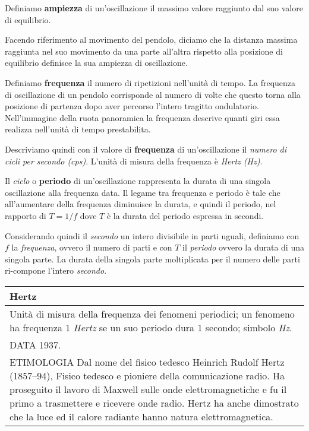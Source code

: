 Definiamo \textbf{ampiezza} di un'oscillazione il massimo valore raggiunto
dal suo valore di equilibrio.

Facendo riferimento al movimento del pendolo, diciamo che la distanza massima
raggiunta nel suo movimento da una parte all'altra rispetto alla posizione di
equilibrio definisce la sua ampiezza di oscillazione.



Definiamo \textbf{frequenza} il numero di ripetizioni nell'unità di tempo. La
frequenza di oscillazione di un pendolo corrisponde al numero di volte che questo
torna alla posizione di partenza dopo aver percorso l'intero tragitto ondulatorio.
Nell'immagine della ruota panoramica la frequenza descrive quanti giri essa realizza
nell'unità di tempo prestabilita.

Descriviamo quindi con il valore di \textbf{frequenza} di un'oscillazione il
\emph{numero di cicli per secondo (cps)}. L'unità di misura della frequenza è
\emph{Hertz (Hz)}.



Il \emph{ciclo} o \textbf{periodo} di un'oscillazione rappresenta la durata di
una singola oscillazione alla frequenza data.
Il legame tra frequenza e periodo è tale che all'aumentare della frequenza
diminuisce la durata, e quindi il periodo, nel rapporto di $T = 1/f$ dove
$T$ è la durata del periodo espressa in secondi.

Considerando quindi il \emph{secondo} un intero divisibile in parti uguali,
definiamo con $f$ la \emph{frequenza}, ovvero il numero di parti e con $T$
il \emph{periodo} ovvero la durata di una singola parte. La durata della
singola parte moltiplicata per il numero delle parti ri-compone l'intero \emph{secondo}.

\bigskip

		\begin{tabular}{L{.969\textwidth}}%
		\toprule
			\textbf{Hertz}\\
		\midrule
			Unità di misura della frequenza dei fenomeni periodici; un fenomeno ha
			frequenza 1 \emph{Hertz} se un suo periodo dura 1 secondo; simbolo
			\emph{Hz}.\\

			DATA 1937.\\

			ETIMOLOGIA Dal nome del fisico tedesco Heinrich Rudolf Hertz (1857–94),
			Fisico tedesco e pioniere della comunicazione radio. Ha proseguito il
			lavoro di Maxwell sulle onde elettromagnetiche e fu il primo a trasmettere
			e ricevere onde radio. Hertz ha anche dimostrato che la luce ed il calore
			radiante hanno natura elettromagnetica. \\
		\bottomrule
		\end{tabular}

